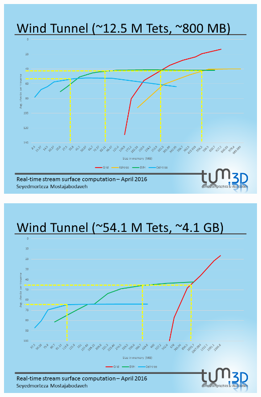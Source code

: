 \documentclass{beamer}
\begin{document}
\begin{frame}{}
	\centering
	\includegraphics[height=\textheight]{figures/Slide25}
\end{frame}

\begin{frame}{}
	\centering
	\includegraphics[height=\textheight]{figures/Slide27}
\end{frame}
\end{document}
